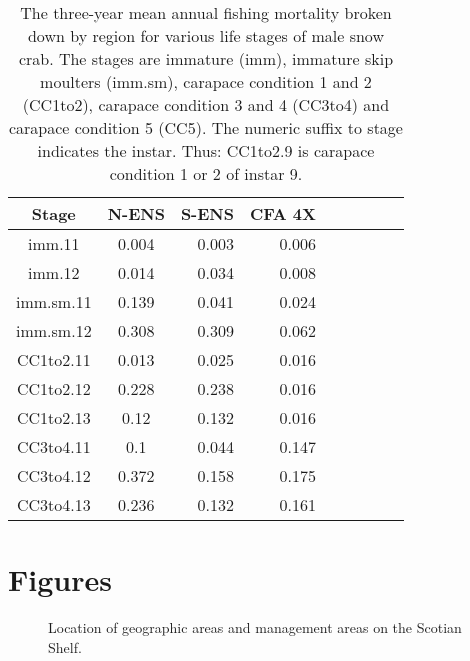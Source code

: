 \documentclass[11pt]{article}
\newcommand*{\D}{.}  %
\begin{document}
\clearpage \newpage
\begin{table}[!tbp]
\caption{The three-year mean annual fishing mortality broken down by region for various life stages of male snow crab. The stages are immature (imm), immature skip moulters (imm.sm), carapace condition 1 and 2 (CC1to2), carapace condition 3 and 4 (CC3to4) and carapace condition 5 (CC5). The numeric suffix to stage indicates the instar. Thus: CC1to2.9 is carapace condition 1 or 2 of instar 9.}
\label{fishing.mortality}
\begin{center}
\begin{tabular}{ccrrrrrrr}
\hline\hline
\multicolumn{1}{c}{Stage}&
\multicolumn{1}{c}{N-ENS}&
\multicolumn{1}{c}{S-ENS}&
\multicolumn{1}{c}{CFA 4X}
\\ \hline

imm.11&0.004&0.003&0.006\\
imm.12&0.014&0.034&0.008\\
imm.sm.11&0.139&0.041&0.024\\
imm.sm.12&0.308&0.309&0.062\\
CC1to2.11&0.013&0.025&0.016\\
CC1to2.12&0.228&0.238&0.016\\
CC1to2.13&0.12&0.132&0.016\\
CC3to4.11&0.1&0.044&0.147\\
CC3to4.12&0.372&0.158&0.175\\
CC3to4.13&0.236&0.132&0.161\\

\hline
\end{tabular}
\end{center}
\end{table}



\clearpage

\section{Figures}

\vspace{2cm}
\begin{figure}[!h]
\begin{center}
\end{center}
\caption{Location of geographic areas and management areas on the Scotian Shelf.}
\label{fig:map.cfa.locations}
\end{figure}
\end{document}
